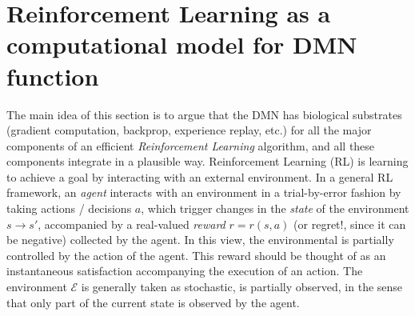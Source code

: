 \documentclass{article} %
\begin{document}
\section{Reinforcement Learning as a computational model for DMN function}
The main idea of this section is to argue that the DMN has biological substrates (gradient
computation, backprop, experience replay, etc.) for all the
major components of an efficient \textit{Reinforcement Learning} algorithm, and all these
components integrate in a plausible way.
Reinforcement Learning (RL) is learning to achieve a goal by interacting with an external
environment. In a general RL framework, an \textit{agent}
interacts with an  environment in a trial-by-error fashion by taking
actions / decisions $a$, which trigger changes in the
\textit{state} of the environment
$s \rightarrow s'$, accompanied by a real-valued \textit{reward}
$r = r(s, a)$ (or regret!, since it can be negative) collected by the
agent. In this view, the environmental is partially controlled by
the action of the agent.
This reward should be thought
of as an instantaneous satisfaction accompanying the execution of
an action.
The environment $\mathcal E$ is generally taken as stochastic,
is partially observed, in the sense that only part of the current state is observed by
the agent.
\end{document}
